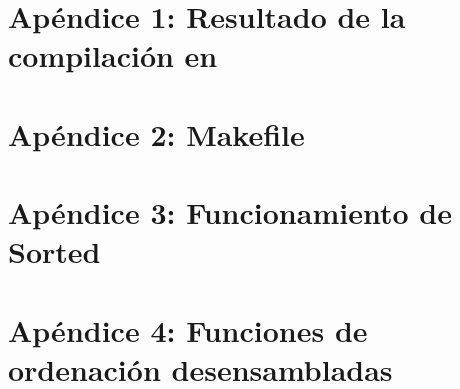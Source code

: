 \documentclass[a4paper,11pt]{book}
\begin{document}
\appendix
\chapter{Apéndice 1: Resultado de la compilación en }\label{chap:apendice1}


\appendix
\chapter{Apéndice 2: Makefile}\label{chap:apendice2}


\appendix
\chapter{Apéndice 3: Funcionamiento de Sorted}\label{chap:apendice3}


\appendix
\chapter{Apéndice 4: Funciones de ordenación desensambladas}\label{chap:apendice4}

\end{document}
